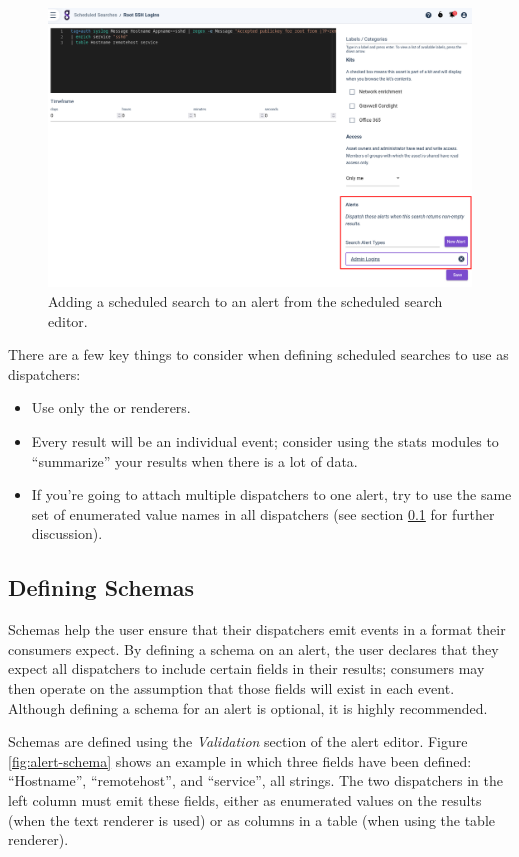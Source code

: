 \begin{figure}
	\includegraphics[width=0.85\linewidth]{images/scheduled-dispatch.png}
	\caption{Adding a scheduled search to an alert from the scheduled search editor.}
	\label{fig:scheduled-dispatch}
\end{figure}

There are a few key things to consider when defining scheduled searches to use as dispatchers:

\begin{itemize}
  \tightlist
\item Use only the  or  renderers.
\item Every result will be an individual event; consider using the stats modules to ``summarize'' your results when there is a lot of data.
\item If you're going to attach multiple dispatchers to one alert, try to use the same set of enumerated value names in all dispatchers (see section \ref{sec:alert-schemas} for further discussion).
\end{itemize}

\clearpage
\subsection{Defining Schemas}
\label{sec:alert-schemas}
Schemas help the user ensure that their dispatchers emit events in a format their consumers expect. By defining a schema on an alert, the user declares that they expect all dispatchers to include certain fields in their results; consumers may then operate on the assumption that those fields will exist in each event. Although defining a schema for an alert is optional, it is highly recommended.

Schemas are defined using the \emph{Validation} section of the alert editor. Figure \ref{fig:alert-schema} shows an example in which three fields have been defined: ``Hostname'', ``remotehost'', and ``service'', all strings. The two dispatchers in the left column must emit these fields, either as enumerated values on the results (when the text renderer is used) or as columns in a table (when using the table renderer).

